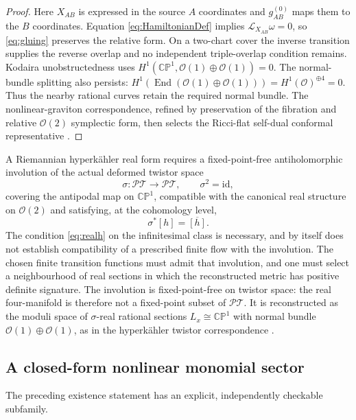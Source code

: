 \documentclass[aps,prd,reprint,nofootinbib,superscriptaddress]{revtex4-2}
\theoremstyle{definition}
\theoremstyle{remark}
\newcommand{\CP}{\mathbb{CP}}
\newcommand{\cO}{\mathcal{O}}
\newcommand{\PT}{\mathcal{PT}}
\newcommand{\id}{\mathrm{id}}
\begin{document}
\begin{proof}
Here $X_{AB}$ is expressed in the source $A$ coordinates and $g_{AB}^{(0)}$ maps them to the $B$ coordinates. Equation \eqref{eq:HamiltonianDef} implies $\mathcal L_{X_{AB}}\omega=0$, so \eqref{eq:gluing} preserves the relative form. On a two-chart cover the inverse transition supplies the reverse overlap and no independent triple-overlap condition remains. Kodaira unobstructedness uses $H^1(\CP^1,\cO(1)\oplus\cO(1))=0$. The normal-bundle splitting also persists: $H^1(\operatorname{End}(\cO(1)\oplus\cO(1)))=H^1(\cO)^{\oplus4}=0$. Thus the nearby rational curves retain the required normal bundle. The nonlinear-graviton correspondence, refined by preservation of the fibration and relative $\cO(2)$ symplectic form, then selects the Ricci-flat self-dual conformal representative \cite{Penrose1976,HitchinKarlhede1987}.
\end{proof}

A Riemannian hyperk\"ahler real form requires a fixed-point-free antiholomorphic involution of the actual deformed twistor space
\begin{equation}
\sigma:\PT\to\PT,
\qquad \sigma^2=\id,
\label{eq:reality}
\end{equation}
covering the antipodal map on $\CP^1$, compatible with the canonical real structure on $\cO(2)$ and satisfying, at the cohomology level,
\begin{equation}
\sigma^*[h]=\overline{[h]}.
\label{eq:realh}
\end{equation}
The condition \eqref{eq:realh} on the infinitesimal class is necessary, and by itself does not establish compatibility of a prescribed finite flow with the involution. The chosen finite transition functions must admit that involution, and one must select a neighbourhood of real sections in which the reconstructed metric has positive definite signature. The involution is fixed-point-free on twistor space: the real four-manifold is therefore not a fixed-point subset of $\PT$.  It is reconstructed as the moduli space of $\sigma$-real rational sections $L_x\cong\CP^1$ with normal bundle $\cO(1)\oplus\cO(1)$, as in the hyperk\"ahler twistor correspondence \cite{HitchinKarlhede1987}.

\subsection{A closed-form nonlinear monomial sector}
\label{subsec:ExactNonlinearSeed}

The preceding existence statement has an explicit, independently checkable subfamily.
\end{document}
